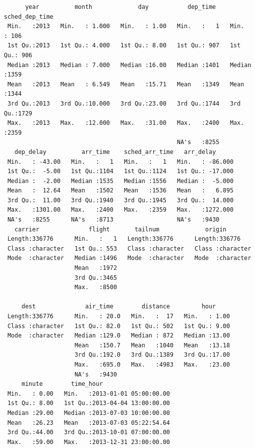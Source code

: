 \documentclass[
  10pt,
  letterpaper,
  DIV=11,
  numbers=noendperiod]{scrartcl}
\begin{document}
\begin{verbatim}
      year          month             day           dep_time    sched_dep_time
 Min.   :2013   Min.   : 1.000   Min.   : 1.00   Min.   :   1   Min.   : 106  
 1st Qu.:2013   1st Qu.: 4.000   1st Qu.: 8.00   1st Qu.: 907   1st Qu.: 906  
 Median :2013   Median : 7.000   Median :16.00   Median :1401   Median :1359  
 Mean   :2013   Mean   : 6.549   Mean   :15.71   Mean   :1349   Mean   :1344  
 3rd Qu.:2013   3rd Qu.:10.000   3rd Qu.:23.00   3rd Qu.:1744   3rd Qu.:1729  
 Max.   :2013   Max.   :12.000   Max.   :31.00   Max.   :2400   Max.   :2359  
                                                 NA's   :8255                 
   dep_delay          arr_time    sched_arr_time   arr_delay       
 Min.   : -43.00   Min.   :   1   Min.   :   1   Min.   : -86.000  
 1st Qu.:  -5.00   1st Qu.:1104   1st Qu.:1124   1st Qu.: -17.000  
 Median :  -2.00   Median :1535   Median :1556   Median :  -5.000  
 Mean   :  12.64   Mean   :1502   Mean   :1536   Mean   :   6.895  
 3rd Qu.:  11.00   3rd Qu.:1940   3rd Qu.:1945   3rd Qu.:  14.000  
 Max.   :1301.00   Max.   :2400   Max.   :2359   Max.   :1272.000  
 NA's   :8255      NA's   :8713                  NA's   :9430      
   carrier              flight       tailnum             origin         
 Length:336776      Min.   :   1   Length:336776      Length:336776     
 Class :character   1st Qu.: 553   Class :character   Class :character  
 Mode  :character   Median :1496   Mode  :character   Mode  :character  
                    Mean   :1972                                        
                    3rd Qu.:3465                                        
                    Max.   :8500                                        
                                                                        
     dest              air_time        distance         hour      
 Length:336776      Min.   : 20.0   Min.   :  17   Min.   : 1.00  
 Class :character   1st Qu.: 82.0   1st Qu.: 502   1st Qu.: 9.00  
 Mode  :character   Median :129.0   Median : 872   Median :13.00  
                    Mean   :150.7   Mean   :1040   Mean   :13.18  
                    3rd Qu.:192.0   3rd Qu.:1389   3rd Qu.:17.00  
                    Max.   :695.0   Max.   :4983   Max.   :23.00  
                    NA's   :9430                                  
     minute        time_hour                     
 Min.   : 0.00   Min.   :2013-01-01 05:00:00.00  
 1st Qu.: 8.00   1st Qu.:2013-04-04 13:00:00.00  
 Median :29.00   Median :2013-07-03 10:00:00.00  
 Mean   :26.23   Mean   :2013-07-03 05:22:54.64  
 3rd Qu.:44.00   3rd Qu.:2013-10-01 07:00:00.00  
 Max.   :59.00   Max.   :2013-12-31 23:00:00.00  
                                                 
\end{verbatim}
\end{document}
